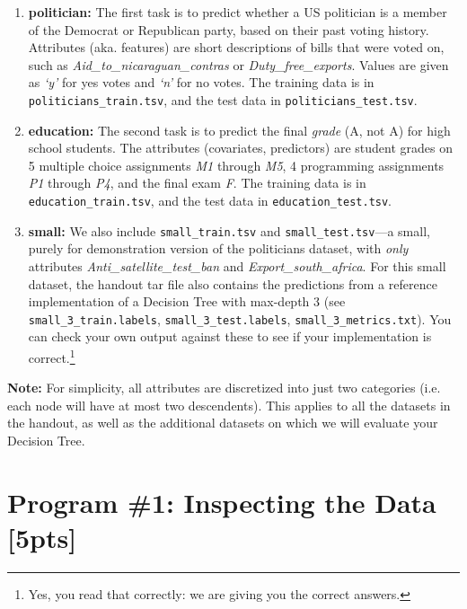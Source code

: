 \documentclass[11pt,addpoints,answers]{exam}
\begin{document}
\begin{enumerate}
\item \textbf{politician:}
    The first task is to predict whether a US politician is a member of the Democrat or Republican party, based on their past voting history. Attributes (aka. features) are short descriptions of bills that were voted on, such as \emph{Aid\_to\_nicaraguan\_contras} or \emph{Duty\_free\_exports}. Values are given as \emph{`y'} for yes votes and \emph{`n'} for no votes. The training data is in \lstinline{politicians_train.tsv}, and the test data in \lstinline{politicians_test.tsv}.
\item \textbf{education:}
    The second task is to predict the final \emph{grade} (A, not A) for high school students. The attributes (covariates, predictors) are student grades on 5 multiple choice assignments \emph{M1} through \emph{M5}, 4 programming assignments \emph{P1} through \emph{P4}, and the final exam \emph{F}. The training data is in \newline \lstinline{education_train.tsv}, and the test data in \lstinline{education_test.tsv}.
\item \textbf{small:}
    We also include \lstinline{small_train.tsv} and \lstinline{small_test.tsv}---a small, purely for demonstration version of the politicians dataset, with \emph{only} attributes \emph{Anti\_satellite\_test\_ban} and \newline \emph{Export\_south\_africa}.  
    For this small dataset, the handout tar file also contains the predictions from a reference implementation of a Decision Tree with max-depth 3 (see \lstinline{small_3_train.labels}, \lstinline{small_3_test.labels}, \lstinline{small_3_metrics.txt}).
    You can check your own output against these to see if your implementation is correct.\footnote{Yes, you read that correctly: we are giving you the correct answers.}
\end{enumerate}

\begin{notebox} \textbf{Note:}
For simplicity, all attributes are discretized into just two categories (i.e. each node will have at most two descendents). This applies to all the datasets in the handout, as well as the additional datasets on which we will evaluate your Decision Tree.
\end{notebox}

\newpage
\section{Program \#1: Inspecting the Data [5pts]}
\label{sec:inspect}
\end{document}

